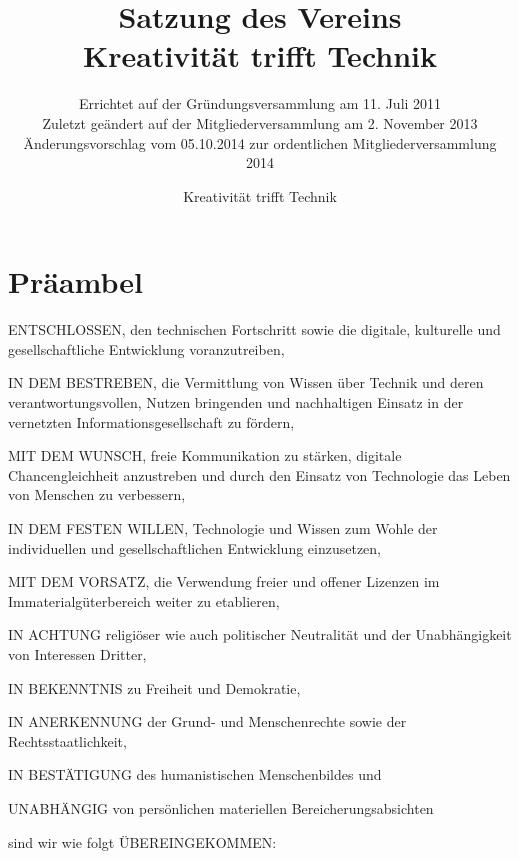 \documentclass[a4paper,10pt]{scrreprt}
\begin{document}
\title{Satzung des Vereins\\Kreativität trifft Technik}
\subtitle{
	Errichtet auf der Gründungsversammlung am 11. Juli 2011\\
	Zuletzt geändert auf der Mitgliederversammlung am 2. November 2013\\
	Änderungsvorschlag vom 05.10.2014 zur ordentlichen Mitgliederversammlung 2014
}
\author{Kreativität trifft Technik}



\section*{Präambel}

ENTSCHLOSSEN, den technischen Fortschritt sowie die digitale, kulturelle und
gesellschaftliche Entwicklung voranzutreiben,

IN DEM BESTREBEN, die Vermittlung von Wissen über Technik und deren
verantwortungsvollen, Nutzen bringenden und nachhaltigen Einsatz in der
vernetzten Informationsgesellschaft zu fördern,

MIT DEM WUNSCH, freie Kommunikation zu stärken, digitale Chancengleichheit
anzustreben und durch den Einsatz von Technologie das Leben von Menschen zu
verbessern,

IN DEM FESTEN WILLEN, Technologie und Wissen zum Wohle der individuellen und
gesellschaftlichen Entwicklung einzusetzen,

MIT DEM VORSATZ, die Verwendung freier und offener Lizenzen im
Immaterialgüterbereich weiter zu etablieren,

IN ACHTUNG religiöser wie auch politischer Neutralität und der Unabhängigkeit
von Interessen Dritter,

IN BEKENNTNIS zu Freiheit und Demokratie,

IN ANERKENNUNG der Grund- und Menschenrechte sowie der Rechtsstaatlichkeit,

IN BESTÄTIGUNG des humanistischen Menschenbildes und

UNABHÄNGIG von persönlichen materiellen Bereicherungsabsichten

sind wir wie folgt ÜBEREINGEKOMMEN:

\newpage
\end{document}
